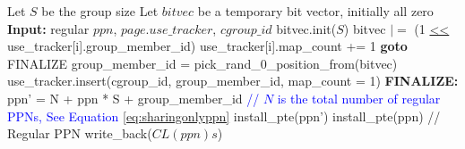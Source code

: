 \begin{algorithm}
\caption{Additional Action during Page Mapping}
\label{alg:page-mapping}
\begin{algorithmic}[1]
\STATE Let $S$ be the group size
\STATE Let $bitvec$ be a temporary bit vector, initially all zero
\STATE \textbf{Input:} regular $ppn$, $page.use\_tracker$, $cgroup\_id$
\STATE bitvec.init($S$)
    \STATE bitvec $|=$ (1 \url{<<} use\_tracker[i].group\_member\_id)
        \STATE use\_tracker[i].map\_count += 1
        \STATE \textbf{goto} FINALIZE
    \ENDIF
\ENDFOR
\STATE group\_member\_id = pick\_rand\_0\_position\_from(bitvec)
\STATE use\_tracker.insert(cgroup\_id, group\_member\_id, map\_count = 1)
\STATE \textbf{FINALIZE:}
    \STATE ppn' = N + ppn * S + group\_member\_id \hfill \textcolor{blue} {// $N$ is the total number of regular PPNs, See Equation \ref{eq:sharingonlyppn}}
    \STATE install\_pte(ppn')
\ELSE
    \STATE install\_pte(ppn) \hfill // Regular PPN
    \STATE write\_back($CL(ppn)s$)
\ENDIF
\end{algorithmic}
\end{algorithm}
